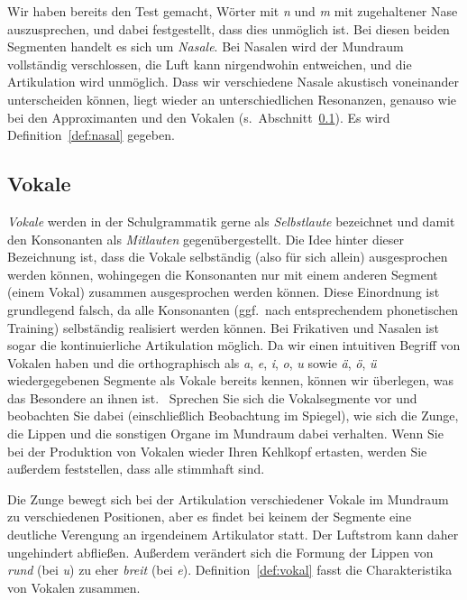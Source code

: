 Wir haben bereits den Test gemacht, Wörter mit \textit{n} und \textit{m} mit zugehaltener Nase auszusprechen, und dabei festgestellt, dass dies unmöglich ist.
Bei diesen beiden Segmenten handelt es sich um \textit{Nasale}.
Bei Nasalen wird der Mundraum vollständig verschlossen, die Luft kann nirgendwohin entweichen, und die Artikulation wird unmöglich.
Dass wir verschiedene Nasale akustisch voneinander unterscheiden können, liegt wieder an unterschiedlichen Resonanzen, genauso wie bei den Approximanten und den Vokalen (s.\ Abschnitt~\ref{sec:vokale}).
Es wird Definition~\ref{def:nasal} gegeben.


\subsection{Vokale}

\label{sec:vokale}

\textit{Vokale} werden in der Schulgrammatik gerne als \textit{Selbstlaute} bezeichnet und damit den Konsonanten als \textit{Mitlauten} gegenübergestellt.
Die Idee hinter dieser Bezeichnung ist, dass die Vokale selbständig (also für sich allein) ausgesprochen werden können, wohingegen die Konsonanten nur mit einem anderen Segment (einem Vokal) zusammen ausgesprochen werden können.
Diese Einordnung ist grundlegend falsch, da alle Konsonanten (ggf.\ nach entsprechendem phonetischen Training) selbständig realisiert werden können.
Bei Frikativen und Nasalen ist sogar die kontinuierliche Artikulation möglich.
Da wir einen intuitiven Begriff von Vokalen haben und die orthographisch als \textit{a}, \textit{e}, \textit{i}, \textit{o}, \textit{u} sowie \textit{ä}, \textit{ö}, \textit{ü} wiedergegebenen Segmente als Vokale bereits kennen, können wir überlegen, was das Besondere an ihnen ist.
\TuBegin~Sprechen Sie sich die Vokalsegmente vor und beobachten Sie dabei (einschließlich Beobachtung im Spiegel), wie sich die Zunge, die Lippen und die sonstigen Organe im Mundraum dabei verhalten. Wenn Sie bei der Produktion von Vokalen wieder Ihren Kehlkopf ertasten, werden Sie außerdem feststellen, dass alle stimmhaft sind.

Die Zunge bewegt sich bei der Artikulation verschiedener Vokale im Mund\-raum zu verschiedenen Positionen, aber es findet bei keinem der Segmente eine deutliche Verengung an irgendeinem Artikulator statt.
Der Luftstrom kann daher ungehindert abfließen.
Außerdem verändert sich die Formung der Lippen von \textit{rund} (\zB bei \textit{u}) zu eher \textit{breit} (\zB bei \textit{e}).
Definition~\ref{def:vokal} fasst die Charakteristika von Vokalen zusammen.

